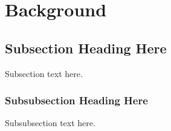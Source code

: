 \section{Background}

 

\subsection{Subsection Heading Here}
Subsection text here.


\subsubsection{Subsubsection Heading Here}
Subsubsection text here.
